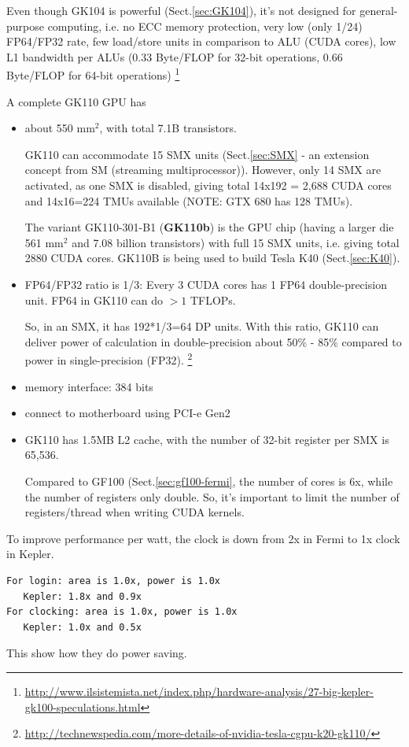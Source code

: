 Even though GK104 is powerful (Sect.\ref{sec:GK104}), it's not designed for
general-purpose computing, i.e. no ECC memory protection, very low (only 1/24)
FP64/FP32 rate, few load/store units in comparison to ALU (CUDA cores), low L1
bandwidth per ALUs (0.33 Byte/FLOP for 32-bit operations, 0.66 Byte/FLOP for
64-bit operations)
\footnote{\url{http://www.ilsistemista.net/index.php/hardware-analysis/27-big-kepler-gk100-speculations.html}}

A complete GK110 GPU has 
\begin{itemize}
  \item  about 550 mm$^2$, with total 7.1B transistors. 
  
  GK110 can accommodate 15 SMX units (Sect.\ref{sec:SMX} - an extension concept
  from SM (streaming multiprocessor)). However, only 14 SMX are
  activated, as one SMX is disabled, giving total 14x192 = 2,688 CUDA cores
  and 14x16=224 TMUs available (NOTE: GTX 680 has 128 TMUs). 
  
  The variant GK110-301-B1 ({\bf GK110b}) is the GPU chip (having a larger die
  561 mm$^2$ and 7.08 billion transistors) with full 15 SMX units, i.e.
  giving total 2880 CUDA cores. GK110B is being used to build Tesla K40
  (Sect.\ref{sec:K40}).


  \item FP64/FP32 ratio is 1/3: Every 3 CUDA cores has 1 FP64 double-precision
  unit. FP64 in GK110 can do $> 1$ TFLOPs.

So, in an SMX, it has 192*1/3=64 DP units. With this ratio, GK110 can deliver
power of calculation in double-precision about 50\% - 85\% compared to power in
single-precision (FP32).
\footnote{\url{http://technewspedia.com/more-details-of-nvidia-tesla-cgpu-k20-gk110/}}
  
  \item memory interface: 384 bits
  
  \item connect to motherboard using PCI-e Gen2
  
  \item GK110 has 1.5MB L2 cache, with the number of 32-bit register per SMX is 65,536.

Compared to GF100 (Sect.\ref{sec:gf100-fermi}, the number of cores is 6x, while
the number of registers only double. So, it's important to limit the number of
registers/thread when writing CUDA kernels.
  
\end{itemize}


To improve performance per watt, the clock is down from 2x in Fermi to 1x clock
in Kepler.
\begin{verbatim}
For login: area is 1.0x, power is 1.0x
   Kepler: 1.8x and 0.9x
For clocking: area is 1.0x, power is 1.0x
   Kepler: 1.0x and 0.5x
\end{verbatim}
This show how they do power saving.

